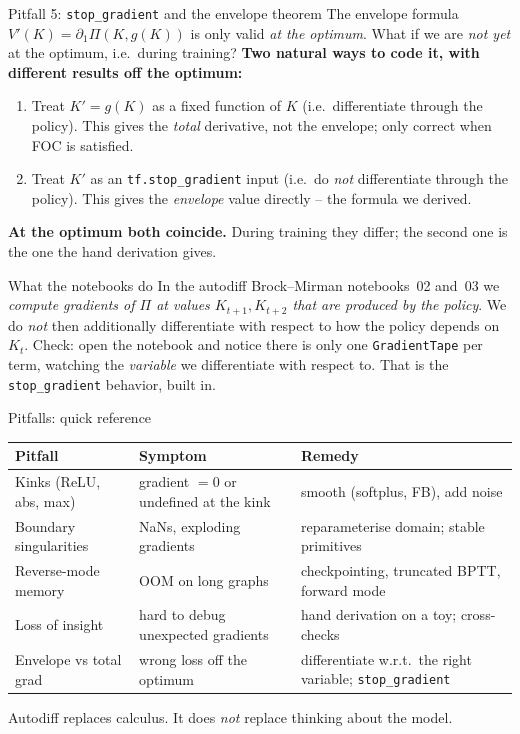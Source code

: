 \documentclass[aspectratio=169,11pt]{beamer}
\newcommand{\emphc}[1]{\textcolor{harvardcrimson}{#1}}
\begin{document}
\begin{frame}[fragile,shrink=15]{Pitfall 5: \texttt{stop\_gradient} and the envelope theorem}
\small The envelope formula $V'(K) = \partial_1 \Pi(K, g(K))$ is only valid \emph{at the optimum}. What if we are \emph{not yet} at the optimum, i.e.\ during training?
\vspace{4pt}
\textbf{Two natural ways to code it, with different results off the optimum:}
\begin{enumerate}\itemsep3pt
\item \emphc{Treat $K' = g(K)$ as a fixed function of $K$} (i.e.\ differentiate through the policy). This gives the \emph{total} derivative, not the envelope; only correct when FOC is satisfied.
\item \emphc{Treat $K'$ as an \texttt{tf.stop\_gradient} input} (i.e.\ do \emph{not} differentiate through the policy). This gives the \emph{envelope} value directly -- the formula we derived.
\end{enumerate}
\vspace{4pt}
\textbf{At the optimum both coincide.} During training they differ; the second one is the one the hand derivation gives.
\begin{exampleblock}{What the notebooks do}
\small In the autodiff Brock--Mirman notebooks~02 and~03 we \emph{compute gradients of $\Pi$ at values $K_{t+1}, K_{t+2}$ that are produced by the policy}. We do \emph{not} then additionally differentiate with respect to how the policy depends on $K_t$. Check: open the notebook and notice there is only one \texttt{GradientTape} per term, watching the \emph{variable} we differentiate with respect to. That is the \texttt{stop\_gradient} behavior, built in.
\end{exampleblock}
\end{frame}

\begin{frame}[fragile]{Pitfalls: quick reference}
\footnotesize
\begin{center}
\renewcommand{\arraystretch}{1.2}
\begin{tabular}{p{3.2cm} p{4.4cm} p{4.6cm}}
\toprule
\textbf{Pitfall} & \textbf{Symptom} & \textbf{Remedy} \\
\midrule
Kinks (ReLU, abs, max) & gradient $=0$ or undefined at the kink & smooth (softplus, FB), add noise \\
Boundary singularities & NaNs, exploding gradients & reparameterise domain; stable primitives \\
Reverse-mode memory & OOM on long graphs & checkpointing, truncated BPTT, forward mode \\
Loss of insight & hard to debug unexpected gradients & hand derivation on a toy; cross-checks \\
Envelope vs total grad & wrong loss off the optimum & differentiate w.r.t.\ the right variable; \texttt{stop\_gradient} \\
\bottomrule
\end{tabular}
\end{center}
\vspace{6pt}
\centerline{\emphc{Autodiff replaces calculus. It does \emph{not} replace thinking about the model.}}
\end{frame}
\end{document}

